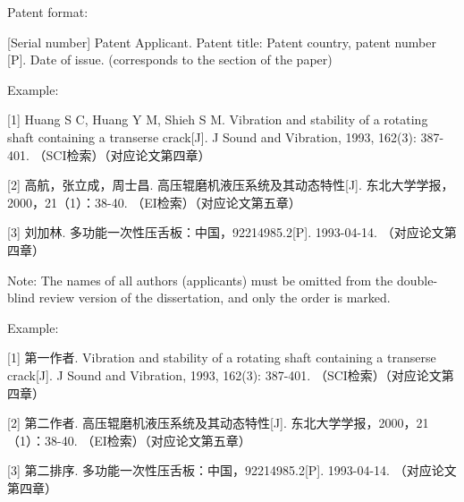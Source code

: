 Patent format:

[Serial number] Patent Applicant. Patent title: Patent country, patent number [P]. Date of issue. (corresponds to the section of the paper)

Example:

[1] Huang S C, Huang Y M, Shieh S M. Vibration and stability of a rotating shaft containing a transerse crack[J]. J Sound and Vibration, 1993, 162(3): 387-401. （SCI检索）（对应论文第四章）

[2] 高航，张立成，周士昌. 高压辊磨机液压系统及其动态特性[J]. 东北大学学报，2000，21（1）：38-40. （EI检索）（对应论文第五章）

[3] 刘加林. 多功能一次性压舌板：中国，92214985.2[P]. 1993-04-14. （对应论文第四章）


Note: The names of all authors (applicants) must be omitted from the double-blind review version of the dissertation, and only the order is marked.

Example:

[1] 第一作者. Vibration and stability of a rotating shaft containing a transerse crack[J]. J Sound and Vibration, 1993, 162(3): 387-401. （SCI检索）（对应论文第四章）

[2] 第二作者. 高压辊磨机液压系统及其动态特性[J]. 东北大学学报，2000，21（1）：38-40. （EI检索）（对应论文第五章）

[3] 第二排序. 多功能一次性压舌板：中国，92214985.2[P]. 1993-04-14. （对应论文第四章）




